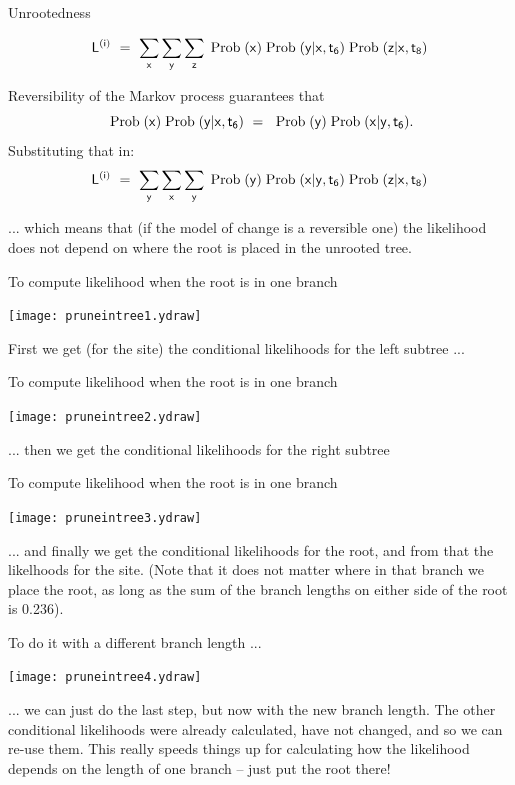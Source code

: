 \documentclass[bluish,slideColor,colorBG,pdf]{prosper}
\def\prob{{\rm \;Prob\;}}
\begin{document}
\begin{slide}[Replace]{Unrootedness}

\[
\mathsf{L^{(i)}\ =\ \sum\limits_x \sum\limits_y \sum\limits_z \prob(x) \prob(y|x, t_6) \prob(z|x, t_8)}
\]

Reversibility of the Markov process guarantees that
\[
\mathsf{\prob(x) \prob(y|x, t_6)\ =\ \prob(y) \prob(x|y, t_6).}
\]
Substituting that in:
\[
\mathsf{L^{(i)}\ =\ \sum\limits_y \sum\limits_x \sum\limits_y \prob(y) \prob(x|y, t_6) \prob(z|x, t_8)}
\]
\bigskip

... which means that (if the model of change is a reversible one) the likelihood does not depend on where the root is placed
in the unrooted tree.

\end{slide}

\begin{slide}[Replace]{To compute likelihood when the root is in one branch}
\bigskip

\centerline{\texttt{[image: pruneintree1.ydraw]}}
\bigskip

First we get (for the site) the conditional likelihoods for the left
subtree ...

\end{slide}

\begin{slide}[Replace]{To compute likelihood when the root is in one branch}
\bigskip

\centerline{\texttt{[image: pruneintree2.ydraw]}}
\bigskip

... then we get the conditional likelihoods for the right subtree

\end{slide}

\begin{slide}[Replace]{To compute likelihood when the root is in one branch}
\bigskip

\centerline{\texttt{[image: pruneintree3.ydraw]}}
\bigskip

... and finally we get the conditional likelihoods for the root, and
from that the likelhoods for the site.   (Note that it does not matter
where in that branch we place the root, as long as the sum of the
branch lengths on either side of the root is 0.236).

\end{slide}

\begin{slide}[Replace]{To do it with a different branch length ... }
\bigskip

\centerline{\texttt{[image: pruneintree4.ydraw]}}
\bigskip

... we can just do the last step, but now with the new branch length.
The other conditional likelihoods were already calculated, have not
changed, and so we can re-use them.   This really speeds things up
for calculating how the likelihood depends on the length of one branch --
just put the root there!

\end{slide}
\end{document}
